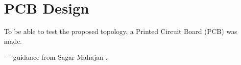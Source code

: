 \chapter{PCB Design}\label{ch:PCB}

To be able to test the proposed topology,
a Printed Circuit Board (PCB) was made.


- 
- guidance from Sagar Mahajan .

